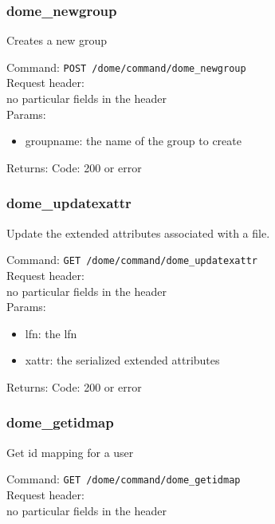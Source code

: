 \documentclass[a4paper,10pt]{scrreprt}
\begin{document}
\subsubsection{dome\_newgroup}

Creates a new group

Command:
\lstinline"POST /dome/command/dome_newgroup"\\

Request header:\\
no particular fields in the header\\

Params:
\begin{itemize}
 \item groupname: the name of the group to create
\end{itemize}

Returns:
Code: 200 or error




\subsubsection{dome\_updatexattr}

Update the extended attributes associated with a file.

Command:
\lstinline"GET /dome/command/dome_updatexattr"\\

Request header:\\
no particular fields in the header\\

Params:
\begin{itemize}
  \item lfn: the lfn
  \item xattr: the serialized extended attributes
\end{itemize}

Returns:
Code: 200 or error

\subsubsection{dome\_getidmap}

Get id mapping for a user

Command:
\lstinline"GET /dome/command/dome_getidmap"\\

Request header:\\
no particular fields in the header\\
\end{document}
